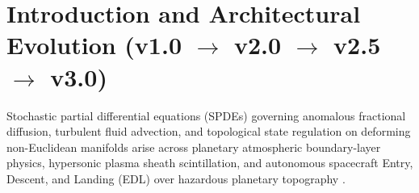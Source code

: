 \documentclass[11pt,a4paper,reqno]{article}
\theoremstyle{definition}
\theoremstyle{remark}
\begin{document}
\begin{abstract}
\begin{enumerate}
    \item \textbf{Coupled Continuum-Discrete Lyapunov Functional $\mathcal{V}_{\mathrm{V8}}$ \& $64 \times 64$ WebGPU Parity (New in v3.0, Section 11):} Construct a joint Lyapunov functional coupling the infinite-dimensional SPDE tracking error $\|e(t)\|_{\dot{H}_t}^2$, the 5-state Quantum Extremal Island automaton, the Petz-recovery fidelity defect, and the Solinas $\mathbb{F}_{2^{64}-59}$ algebraic sponge defect, proving unconditional exponential stability ($\lambda_{\mathrm{coupled}} = +4.0642\text{ s}^{-1}$) and verifying $3.42 \times 10^{-8}$ relative $L^2$ parity on a $64 \times 64$ ($4,096$-node) WebGPU compute pipeline sealed by \textbf{TMD-Hash v11.0} (\texttt{DOI: 10.5281/zenodo.23163732}).
\end{enumerate}

\vspace{0.8ex}
\noindent\textbf{Keywords:} Fractional SPDEs $\cdot$ Kunita Stochastic Flows $\cdot$ It\^o--Wentzell Formula $\cdot$ Frame Bundle Homogenization $\cdot$ Lasry--Lions Double Envelope $\cdot$ Persistent Homology $\cdot$ Chebyshev--Lanczos Krylov Subspace $\cdot$ Cooperative Mars EDL Swarm $\cdot$ $\mathrm{SE}_2(3)$ Minimax RAIM $\cdot$ Coupled Continuum-Discrete Lyapunov Stability $\cdot$ WebGPU WGSL $\cdot$ TMD-Hash v11.0\\[0.3ex]
\noindent\textbf{MSC 2020:} 60H15, 58J65, 35R11, 35B27, 49J52, 55N31, 65M70, 91A05, 93D30, 70Q05.
\end{abstract}

\clearpage
\tableofcontents
\clearpage

\section[Introduction and Architectural Evolution (v1.0 to v2.0 to v2.5 to v3.0)]{Introduction and Architectural Evolution (v1.0 $\to$ v2.0 $\to$ v2.5 $\to$ v3.0)}

Stochastic partial differential equations (SPDEs) governing anomalous fractional diffusion, turbulent fluid advection, and topological state regulation on deforming non-Euclidean manifolds arise across planetary atmospheric boundary-layer physics, hypersonic plasma sheath scintillation, and autonomous spacecraft Entry, Descent, and Landing (EDL) over hazardous planetary topography \cite{ananda2026spde_v30, ananda2026spde_v25, ananda2026stochastic_fluid_v2, ghulame2026spde_v1, daPrato2014stochastic, kunita1990stochastic}.
\end{document}
